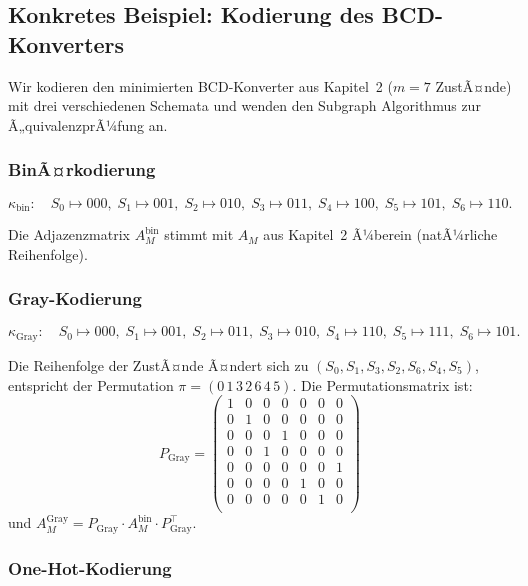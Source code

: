 ﻿\documentclass[a4paper,12pt]{article}
\theoremstyle{definition}
\begin{document}
\subsection{Konkretes Beispiel: Kodierung des BCD-Konverters}

Wir kodieren den minimierten BCD-Konverter aus Kapitel~2 ($m = 7$ ZustÃ¤nde)
mit drei verschiedenen Schemata und wenden den Subgraph Algorithmus zur
Ã„quivalenzprÃ¼fung an.

\subsubsection{BinÃ¤rkodierung}

\[
  \kappa_{\text{bin}}:
  \quad S_0 \mapsto 000,\; S_1 \mapsto 001,\; S_2 \mapsto 010,\;
  S_3 \mapsto 011,\; S_4 \mapsto 100,\; S_5 \mapsto 101,\; S_6 \mapsto 110.
\]

Die Adjazenzmatrix $A_M^{\text{bin}}$ stimmt mit $A_M$ aus Kapitel~2 Ã¼berein (natÃ¼rliche
Reihenfolge).

\subsubsection{Gray-Kodierung}

\[
  \kappa_{\text{Gray}}:
  \quad S_0 \mapsto 000,\; S_1 \mapsto 001,\; S_2 \mapsto 011,\;
  S_3 \mapsto 010,\; S_4 \mapsto 110,\; S_5 \mapsto 111,\; S_6 \mapsto 101.
\]

Die Reihenfolge der ZustÃ¤nde Ã¤ndert sich zu $(S_0, S_1, S_3, S_2, S_6, S_4, S_5)$,
entspricht der Permutation $\pi = (0\,1\,3\,2\,6\,4\,5)$. Die Permutationsmatrix ist:
\[
  P_{\text{Gray}} = \begin{pmatrix}
    1 & 0 & 0 & 0 & 0 & 0 & 0 \\
    0 & 1 & 0 & 0 & 0 & 0 & 0 \\
    0 & 0 & 0 & 1 & 0 & 0 & 0 \\
    0 & 0 & 1 & 0 & 0 & 0 & 0 \\
    0 & 0 & 0 & 0 & 0 & 0 & 1 \\
    0 & 0 & 0 & 0 & 1 & 0 & 0 \\
    0 & 0 & 0 & 0 & 0 & 1 & 0 \\
  \end{pmatrix}
\]
und $A_M^{\text{Gray}} = P_{\text{Gray}} \cdot A_M^{\text{bin}} \cdot P_{\text{Gray}}^\top$.

\subsubsection{One-Hot-Kodierung}
\end{document}

